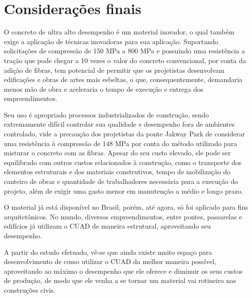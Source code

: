 \documentclass[
	12pt,				%
	openright,			%
	twoside,			%
	a4paper,			%
	english,			%
	french,				%
	spanish,			%
	brazil				%
	]{abntex2}
\begin{document}




%
%


\chapter{Considerações finais}

O concreto de ultra alto desempenho é um material inovador, o qual também exige a aplicação de técnicas inovadoras para sua aplicação. Suportando solicitações de compressão de 150 MPa a 800 MPa e possuindo uma resistência a tração que pode chegar a 10 vezes o valor do concreto convencional, por conta da adição de fibras, tem potencial de permitir que os projetistas desenvolvam edificações e obras de artes mais esbeltas, o que, consequentemente, demandaria menos mão de obra e aceleraria o tempo de execução e entrega dos empreendimentos.

Seu uso é apropriado processos industrializados de construção, sendo extremamente difícil controlar sua qualidade e desempenho fora de ambientes controlado, vide a precaução dos projetistas da ponte Jakway Park de considerar uma resistência à compressão de 148 MPa por conta do método utilizado para misturar o concreto com as fibras. Apesar do seu custo elevado, ele pode ser equilibrado com outros custos relacionados à construção, como o transporte dos elementos estruturais e dos materiais construtivos, tempo de mobilização do canteiro de obras e quantidade de trabalhadores necessária para a execução do projeto, além de exigir uma gasto menor em manutenção a médio e longo prazo.

O material já está disponível no Brasil, porém, até agora, só foi aplicado para fins arquitetônicos. No mundo, diversos empreendimentos, entre pontes, passarelas e edifícios já utilizam o CUAD de maneira estrutural, aproveitando seu desempenho.

A partir do estudo efetuado, vê-se que ainda existe muito espaço para desenvolvimento de como utilizar o CUAD da melhor maneira possível, aproveitando ao máximo o desempenho que ele oferece e diminuir os seus custos de produção, de modo que ele venha a se tornar um material vai rotineiro nas construções civis.
\end{document}
